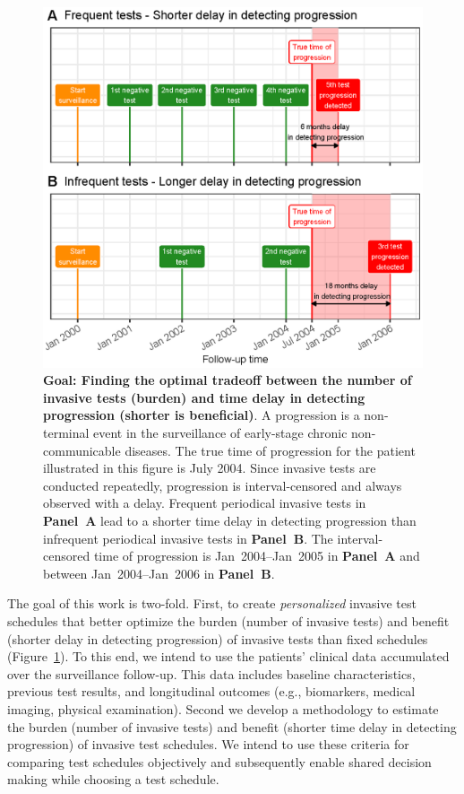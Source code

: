 \documentclass[AMA,STIX1COL]{WileyNJD-v2}
\begin{document}
\begin{figure}[!h]
\centerline{\includegraphics{figure1.eps}}
\caption{\textbf{Goal: Finding the optimal tradeoff between the number of invasive tests (burden) and time delay in detecting progression (shorter is beneficial)}. A progression is a non-terminal event in the surveillance of early-stage chronic non-communicable diseases. The true time of progression for the patient illustrated in this figure is July 2004. Since invasive tests are conducted repeatedly, progression is interval-censored and always observed with a delay. Frequent periodical invasive tests in \textbf{Panel~A} lead to a shorter time delay in detecting progression than infrequent periodical invasive tests in \textbf{Panel~B}. The interval-censored time of progression is Jan~2004--Jan~2005 in \textbf{Panel~A} and between Jan~2004--Jan~2006 in \textbf{Panel~B}.} 
\label{fig:figure1}
\end{figure}

The goal of this work is two-fold. First, to create \emph{personalized} invasive test schedules that better optimize the burden (number of invasive tests) and benefit (shorter delay in detecting progression) of invasive tests than fixed schedules (Figure~\ref{fig:figure1}). To this end, we intend to use the patients' clinical data accumulated over the surveillance follow-up. This data includes baseline characteristics, previous test results, and longitudinal outcomes (e.g., biomarkers, medical imaging, physical examination). Second we develop a methodology to estimate the burden (number of invasive tests) and benefit (shorter time delay in detecting progression) of invasive test schedules. We intend to use these criteria for comparing test schedules objectively and subsequently enable shared decision making while choosing a test schedule.
\end{document}

